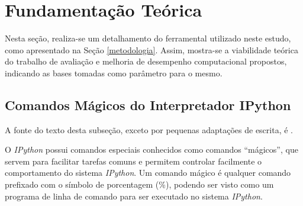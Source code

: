 \documentclass[12pt]{article}
\newcommand{\aspas}[1]{``#1''} %
\begin{document}

\section{Fundamentação Teórica}
\label{fundamentacao}

Nesta seção, realiza-se um detalhamento do ferramental utilizado neste estudo, como apresentado na Seção \ref{metodologia}. Assim, mostra-se a viabilidade teórica do trabalho de avaliação e melhoria de desempenho computacional propostos, indicando as bases tomadas como parâmetro para o mesmo.

\subsection{Comandos Mágicos do Interpretador IPython}

A fonte do texto desta subseção, exceto por pequenas adaptações de escrita, é \cite{mckinney:2018}.

%

O \textit{IPython} possui comandos especiais conhecidos como comandos \aspas{mágicos}, que servem para facilitar tarefas comuns e permitem controlar facilmente o comportamento do sistema \textit{IPython}. Um comando mágico é qualquer comando prefixado com o símbolo de porcentagem (\%), podendo ser visto como um programa de linha de comando para ser executado no sistema \textit{IPython}.
\end{document}
